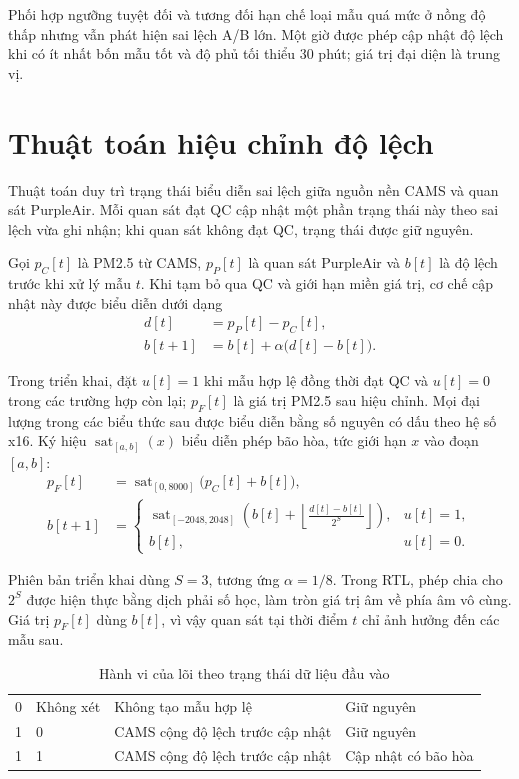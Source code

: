\documentclass[a4paper,oneside,openany]{extreport}
\begin{document}
Phối hợp ngưỡng tuyệt đối và tương đối hạn chế loại mẫu quá mức ở nồng độ thấp nhưng vẫn phát hiện sai lệch A/B lớn. Một giờ được phép cập nhật độ lệch khi có ít nhất bốn mẫu tốt và độ phủ tối thiểu 30 phút; giá trị đại diện là trung vị.

\section{Thuật toán hiệu chỉnh độ lệch}
Thuật toán duy trì trạng thái biểu diễn sai lệch giữa nguồn nền CAMS và quan sát PurpleAir. Mỗi quan sát đạt QC cập nhật một phần trạng thái này theo sai lệch vừa ghi nhận; khi quan sát không đạt QC, trạng thái được giữ nguyên.

Gọi $p_C[t]$ là PM2.5 từ CAMS, $p_P[t]$ là quan sát PurpleAir và $b[t]$ là độ lệch trước khi xử lý mẫu $t$. Khi tạm bỏ qua QC và giới hạn miền giá trị, cơ chế cập nhật này được biểu diễn dưới dạng
\begin{align}
d[t] &= p_P[t]-p_C[t], \\
b[t+1] &= b[t]+\alpha\bigl(d[t]-b[t]\bigr).
\end{align}

Trong triển khai, đặt $u[t]=1$ khi mẫu hợp lệ đồng thời đạt QC và $u[t]=0$ trong các trường hợp còn lại; $p_F[t]$ là giá trị PM2.5 sau hiệu chỉnh. Mọi đại lượng trong các biểu thức sau được biểu diễn bằng số nguyên có dấu theo hệ số x16. Ký hiệu $\operatorname{sat}_{[a,b]}(x)$ biểu diễn phép bão hòa, tức giới hạn $x$ vào đoạn $[a,b]$:
\begin{align}
p_F[t] &= \operatorname{sat}_{[0,8000]}\bigl(p_C[t]+b[t]\bigr), \\
b[t+1] &=
\begin{cases}
\operatorname{sat}_{[-2048,2048]}\!\left(b[t]+\left\lfloor\frac{d[t]-b[t]}{2^S}\right\rfloor\right), & u[t]=1,\\
b[t], & u[t]=0.
\end{cases}
\end{align}

Phiên bản triển khai dùng $S=3$, tương ứng $\alpha=1/8$. Trong RTL, phép chia cho $2^S$ được hiện thực bằng dịch phải số học, làm tròn giá trị âm về phía âm vô cùng. Giá trị $p_F[t]$ dùng $b[t]$, vì vậy quan sát tại thời điểm $t$ chỉ ảnh hưởng đến các mẫu sau.

\begin{table}[!htbp]
\centering
\caption{Hành vi của lõi theo trạng thái dữ liệu đầu vào}
\label{tab:valid_semantics}
\begin{tabularx}{\textwidth}{|C{0.16\textwidth}|C{0.13\textwidth}|Y|Y|}
\hline
{} &  &  &  \\
 & Không xét & Không tạo mẫu hợp lệ & Giữ nguyên \\
 & 0 & CAMS cộng độ lệch trước cập nhật & Giữ nguyên \\
 & 1 & CAMS cộng độ lệch trước cập nhật & Cập nhật có bão hòa \\
\hline
\end{tabularx}
\end{table}
\end{document}
